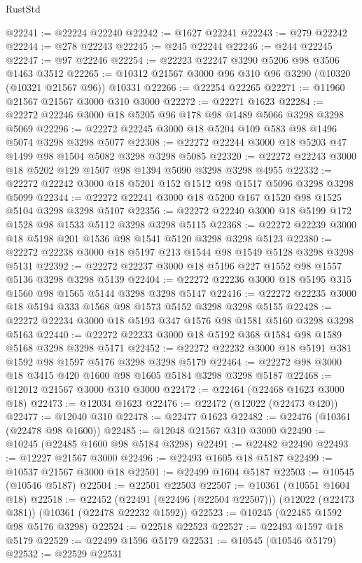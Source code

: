 \begin{lexlean}{RustStd}
\begin{coremodule}
@22241 := @22224 @22240
@22242 := @1627 @22241
@22243 := @279 @22242
@22244 := @278 @22243
@22245 := @245 @22244
@22246 := @244 @22245
@22247 := @97 @22246
@22254 := @22223 @22247 @3290 @5206 @98 @3506 @1463 @3512
@22265 := @10312 @21567 @3000 @96 @310 @96 @3290 (@10320 (@10321 @21567 @96)) @10331
@22266 := @22254 @22265
@22271 := @11960 @21567 @21567 @3000 @310 @3000
@22272 := @22271 @1623
@22284 := @22272 @22246 @3000 @18 @5205 @96 @178 @98 @1489 @5066 @3298 @3298 @5069
@22296 := @22272 @22245 @3000 @18 @5204 @109 @583 @98 @1496 @5074 @3298 @3298 @5077
@22308 := @22272 @22244 @3000 @18 @5203 @47 @1499 @98 @1504 @5082 @3298 @3298 @5085
@22320 := @22272 @22243 @3000 @18 @5202 @129 @1507 @98 @1394 @5090 @3298 @3298 @4955
@22332 := @22272 @22242 @3000 @18 @5201 @152 @1512 @98 @1517 @5096 @3298 @3298 @5099
@22344 := @22272 @22241 @3000 @18 @5200 @167 @1520 @98 @1525 @5104 @3298 @3298 @5107
@22356 := @22272 @22240 @3000 @18 @5199 @172 @1528 @98 @1533 @5112 @3298 @3298 @5115
@22368 := @22272 @22239 @3000 @18 @5198 @201 @1536 @98 @1541 @5120 @3298 @3298 @5123
@22380 := @22272 @22238 @3000 @18 @5197 @213 @1544 @98 @1549 @5128 @3298 @3298 @5131
@22392 := @22272 @22237 @3000 @18 @5196 @227 @1552 @98 @1557 @5136 @3298 @3298 @5139
@22404 := @22272 @22236 @3000 @18 @5195 @315 @1560 @98 @1565 @5144 @3298 @3298 @5147
@22416 := @22272 @22235 @3000 @18 @5194 @333 @1568 @98 @1573 @5152 @3298 @3298 @5155
@22428 := @22272 @22234 @3000 @18 @5193 @347 @1576 @98 @1581 @5160 @3298 @3298 @5163
@22440 := @22272 @22233 @3000 @18 @5192 @368 @1584 @98 @1589 @5168 @3298 @3298 @5171
@22452 := @22272 @22232 @3000 @18 @5191 @381 @1592 @98 @1597 @5176 @3298 @3298 @5179
@22464 := @22272 @98 @3000 @18 @3415 @420 @1600 @98 @1605 @5184 @3298 @3298 @5187
@22468 := @12012 @21567 @3000 @310 @3000
@22472 := @22464 (@22468 @1623 @3000 @18)
@22473 := @12034 @1623
@22476 := @22472 (@12022 (@22473 @420))
@22477 := @12040 @310
@22478 := @22477 @1623
@22482 := @22476 (@10361 (@22478 @98 @1600))
@22485 := @12048 @21567 @310 @3000
@22490 := @10245 (@22485 @1600 @98 @5184 @3298)
@22491 := @22482 @22490
@22493 := @12227 @21567 @3000
@22496 := @22493 @1605 @18 @5187
@22499 := @10537 @21567 @3000 @18
@22501 := @22499 @1604 @5187
@22503 := @10545 (@10546 @5187)
@22504 := @22501 @22503
@22507 := @10361 (@10551 @1604 @18)
@22518 := @22452
    (@22491 (@22496 (@22504 @22507)))
    (@12022 (@22473 @381))
    (@10361 (@22478 @22232 @1592))
@22523 := @10245 (@22485 @1592 @98 @5176 @3298)
@22524 := @22518 @22523
@22527 := @22493 @1597 @18 @5179
@22529 := @22499 @1596 @5179
@22531 := @10545 (@10546 @5179)
@22532 := @22529 @22531

\end{coremodule}
\end{lexlean}
